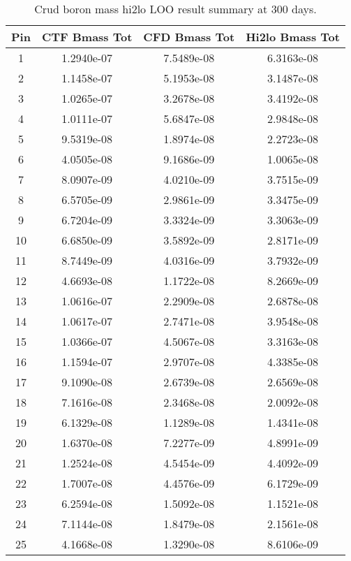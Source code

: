 \begin{table}[h]
    \begin{center}
    \caption[Hi2lo crud boron mass results]{Crud boron mass hi2lo LOO result summary at 300 days.}
    \begin{tabular}[h]{|c|c|c|c|}
        \hline
Pin & CTF Bmass Tot & CFD Bmass Tot & Hi2lo Bmass Tot  \\
\hline
1  & 1.2940e-07 & 7.5489e-08 & 6.3163e-08 \\
2  & 1.1458e-07 & 5.1953e-08 & 3.1487e-08 \\
3  & 1.0265e-07 & 3.2678e-08 & 3.4192e-08 \\
4  & 1.0111e-07 & 5.6847e-08 & 2.9848e-08 \\
5  & 9.5319e-08 & 1.8974e-08 & 2.2723e-08 \\
6  & 4.0505e-08 & 9.1686e-09 & 1.0065e-08 \\
7  & 8.0907e-09 & 4.0210e-09 & 3.7515e-09 \\
8  & 6.5705e-09 & 2.9861e-09 & 3.3475e-09 \\
9  & 6.7204e-09 & 3.3324e-09 & 3.3063e-09 \\
10  & 6.6850e-09 & 3.5892e-09 & 2.8171e-09 \\
11  & 8.7449e-09 & 4.0316e-09 & 3.7932e-09 \\
12  & 4.6693e-08 & 1.1722e-08 & 8.2669e-09 \\
13  & 1.0616e-07 & 2.2909e-08 & 2.6878e-08 \\
14  & 1.0617e-07 & 2.7471e-08 & 3.9548e-08 \\
15  & 1.0366e-07 & 4.5067e-08 & 3.3163e-08 \\
16  & 1.1594e-07 & 2.9707e-08 & 4.3385e-08 \\
17  & 9.1090e-08 & 2.6739e-08 & 2.6569e-08 \\
18  & 7.1616e-08 & 2.3468e-08 & 2.0092e-08 \\
19  & 6.1329e-08 & 1.1289e-08 & 1.4341e-08 \\
20  & 1.6370e-08 & 7.2277e-09 & 4.8991e-09 \\
21  & 1.2524e-08 & 4.5454e-09 & 4.4092e-09 \\
22  & 1.7007e-08 & 4.4576e-09 & 6.1729e-09 \\
23  & 6.2594e-08 & 1.5092e-08 & 1.1521e-08 \\
24  & 7.1144e-08 & 1.8479e-08 & 2.1561e-08 \\
25  & 4.1668e-08 & 1.3290e-08 & 8.6106e-09 \\
\hline
\end{tabular}
\label{tab:loo_crud_bmass}
\end{center}
\end{table}


